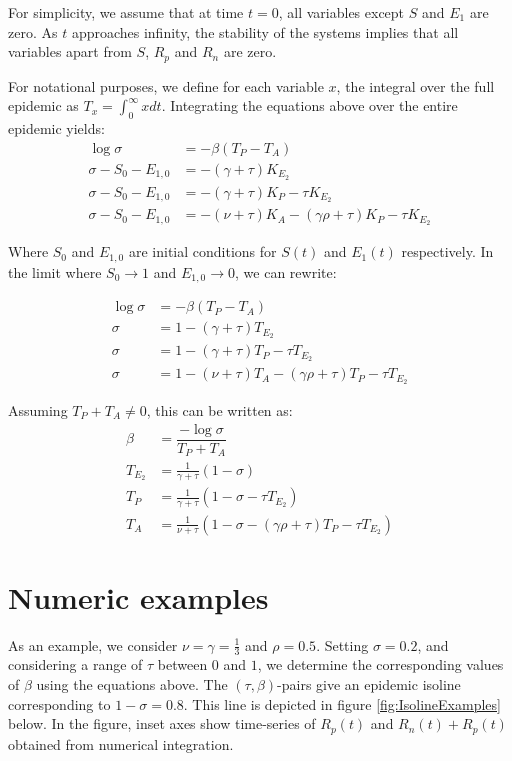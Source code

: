 \documentclass[10pt,a4paper]{article}
\begin{document}
For simplicity, we assume that at time $t=0$, all variables except $S$ and $E_1$ are zero. 
As $t$ approaches infinity, the stability of the systems implies that all variables apart from $S$, $R_p$ and $R_n$ are zero. 

For notational purposes, we define for each variable $x$, the integral over the full epidemic as $T_x = \int_0^{\infty} x dt$.
Integrating the equations above over the entire epidemic yields:
\begin{align}
    \log{\sigma} &= - \beta (T_P - T_A) \\
    \sigma - S_0 - E_{1,0} &= - (\gamma + \tau) K_{E_2} \\
    \sigma - S_0 - E_{1,0} &= -(\gamma + \tau) K_P - \tau K_{E_2} \\
    \sigma - S_0 - E_{1,0} &= -(\nu + \tau) K_A -(\gamma \rho + \tau) K_P - \tau K_{E_2}
\end{align}

Where $S_0$ and $E_{1,0}$ are initial conditions for $S(t)$ and $E_1(t)$ respectively. 
In the limit where $S_0 \rightarrow 1$ and $E_{1,0} \rightarrow 0$, we can rewrite:

\begin{align}
    \log{\sigma} &= - \beta (T_P - T_A) \\
    \sigma &= 1 - (\gamma + \tau) T_{E_2} \\
    \sigma &= 1 -(\gamma + \tau) T_P - \tau T_{E_2} \\
    \sigma &= 1 -(\nu + \tau) T_A -(\gamma \rho + \tau) T_P - \tau T_{E_2}
\end{align}

Assuming $T_P + T_A \neq 0$, this can be written as:
\begin{align}
    \beta &= \dfrac{-\log \sigma}{T_P + T_A} \\
    T_{E_2} &= \frac{1}{\gamma + \tau} \left(1-\sigma \right)  \\
    T_P &= \frac{1}{\gamma + \tau}\left( 1 - \sigma - \tau T_{E_2} \right)\\
    T_A &= \frac{1}{\nu + \tau} \left(1 - \sigma -(\gamma \rho + \tau) T_P - \tau T_{E_2}\right)
\end{align}


\section{Numeric examples}
As an example, we consider $\nu = \gamma = \frac{1}{3}$ and $\rho = 0.5$. 
Setting $\sigma = 0.2$, and considering a range of $\tau$ between $0$ and $1$, we determine the corresponding values of $\beta$ using the equations above. 
The $(\tau,\beta)$-pairs give an epidemic isoline corresponding to $1-\sigma = 0.8$. This line is depicted in figure \ref{fig:IsolineExamples} below. 
In the figure, inset axes show time-series of $R_p(t)$ and $R_n(t)+R_p(t)$ obtained from numerical integration.
\end{document}
